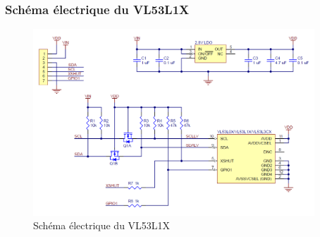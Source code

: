 \documentclass{beamer}
\begin{document}
\begin{frame}
\frametitle{Schéma électrique du VL53L1X}
\begin{center}
\begin{figure}
\includegraphics[height=7cm]{images/VL53L1X_schematic.png}
\caption{Schéma électrique du VL53L1X}
\end{figure}
\end{center}
\end{frame}



\end{document}
